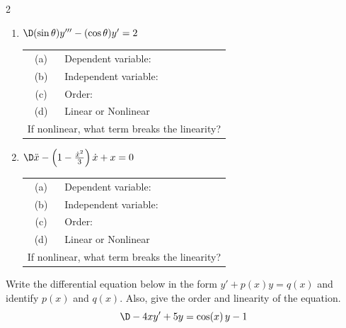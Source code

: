 \documentclass[12pt]{amsart}
\numberwithin{equation}{section}
\begin{document}
\begin{multicols}{2}
\begin{enumerate}[1.]
\vspace{1.2cm}

\item  $\D (\sin \theta)y''' - (\cos \theta)y' = 2$\\

\setlength{\extrarowheight}{0.1cm}
\begin{tabular}{cl}
	(a) & Dependent variable:\\
	(b) & Independent variable:\\
	(c) & Order:\\
	(d) & Linear or Nonlinear \\
	\multicolumn{2}{l}{If nonlinear, what term breaks the linearity?} \\
\end{tabular}

\vspace{1.2cm}

\item  $\D \ddot{x} - \left( 1 - \frac{\dot{x}^2}{3} \right)\dot{x} + x = 0$\\

\setlength{\extrarowheight}{0.1cm}
\begin{tabular}{cl}
	(a) & Dependent variable:\\
	(b) & Independent variable:\\
	(c) & Order:\\
	(d) & Linear or Nonlinear \\
	\multicolumn{2}{l}{If nonlinear, what term breaks the linearity?} \\
\end{tabular}

\end{enumerate}
\end{multicols}

\thispagestyle{empty}
\newpage
\thispagestyle{empty}

\noindent Write the differential equation below in the form $y'+p(x)y=q(x)$ and identify $p(x)$ and $q(x)$.  Also, give the order and linearity of the equation.
$$
\D - 4xy' + 5y = \cos (x)\,y - 1
$$

\thispagestyle{empty}
\newpage
\thispagestyle{empty}
\end{document}
